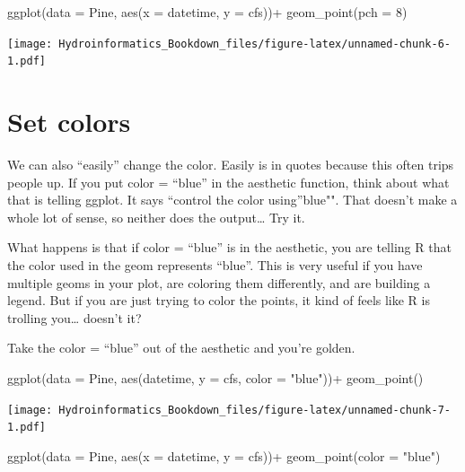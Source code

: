 \documentclass[
]{book}
\newenvironment{Shaded}{\begin{snugshade}}{\end{snugshade}}
\newcommand{\AttributeTok}[1]{\textcolor[rgb]{0.77,0.63,0.00}{#1}}
\newcommand{\DecValTok}[1]{\textcolor[rgb]{0.00,0.00,0.81}{#1}}
\newcommand{\FunctionTok}[1]{\textcolor[rgb]{0.00,0.00,0.00}{#1}}
\newcommand{\NormalTok}[1]{#1}
\newcommand{\SpecialCharTok}[1]{\textcolor[rgb]{0.00,0.00,0.00}{#1}}
\newcommand{\StringTok}[1]{\textcolor[rgb]{0.31,0.60,0.02}{#1}}
\begin{document}
\begin{Shaded}
\begin{Highlighting}[]
\FunctionTok{ggplot}\NormalTok{(}\AttributeTok{data =}\NormalTok{ Pine, }\FunctionTok{aes}\NormalTok{(}\AttributeTok{x =}\NormalTok{ datetime, }\AttributeTok{y =}\NormalTok{ cfs))}\SpecialCharTok{+}
  \FunctionTok{geom\_point}\NormalTok{(}\AttributeTok{pch =} \DecValTok{8}\NormalTok{)}
\end{Highlighting}
\end{Shaded}

\texttt{[image: Hydroinformatics\_Bookdown\_files/figure-latex/unnamed-chunk-6-1.pdf]}

\hypertarget{set-colors}{%
\section{Set colors}\label{set-colors}}

We can also ``easily'' change the color. Easily is in quotes because this often trips people up. If you put color = ``blue'' in the aesthetic function, think about what that is telling ggplot. It says ``control the color using''blue"". That doesn't make a whole lot of sense, so neither does the output\ldots{} Try it.

What happens is that if color = ``blue'' is in the aesthetic, you are telling R that the color used in the geom represents ``blue''. This is very useful if you have multiple geoms in your plot, are coloring them differently, and are building a legend. But if you are just trying to color the points, it kind of feels like R is trolling you\ldots{} doesn't it?

Take the color = ``blue'' out of the aesthetic and you're golden.

\begin{Shaded}
\begin{Highlighting}[]
\FunctionTok{ggplot}\NormalTok{(}\AttributeTok{data =}\NormalTok{ Pine, }\FunctionTok{aes}\NormalTok{(datetime, }\AttributeTok{y =}\NormalTok{ cfs, }\AttributeTok{color =} \StringTok{"blue"}\NormalTok{))}\SpecialCharTok{+}
  \FunctionTok{geom\_point}\NormalTok{()}
\end{Highlighting}
\end{Shaded}

\texttt{[image: Hydroinformatics\_Bookdown\_files/figure-latex/unnamed-chunk-7-1.pdf]}

\begin{Shaded}
\begin{Highlighting}[]
\FunctionTok{ggplot}\NormalTok{(}\AttributeTok{data =}\NormalTok{ Pine, }\FunctionTok{aes}\NormalTok{(}\AttributeTok{x =}\NormalTok{ datetime, }\AttributeTok{y =}\NormalTok{ cfs))}\SpecialCharTok{+}
  \FunctionTok{geom\_point}\NormalTok{(}\AttributeTok{color =} \StringTok{"blue"}\NormalTok{)}
\end{Highlighting}
\end{Shaded}
\end{document}
